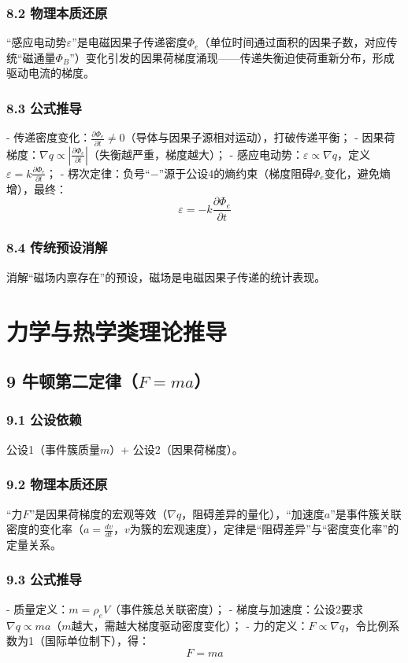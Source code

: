 \documentclass{article}
\newcommand{\rhoe}{\rho_e}       %
\begin{document}
\subsubsection{8.2 物理本质还原}
“感应电动势$\varepsilon$”是电磁因果子传递密度$\Phi_e$（单位时间通过面积的因果子数，对应传统“磁通量$\Phi_B$”）变化引发的因果荷梯度涌现——传递失衡迫使荷重新分布，形成驱动电流的梯度。

\subsubsection{8.3 公式推导}
- 传递密度变化：$\frac{\partial \Phi_e}{\partial t} \neq 0$（导体与因果子源相对运动），打破传递平衡；  
- 因果荷梯度：$\nabla q \propto \left| \frac{\partial \Phi_e}{\partial t} \right|$（失衡越严重，梯度越大）；  
- 感应电动势：$\varepsilon \propto \nabla q$，定义$\varepsilon = k \frac{\partial \Phi_e}{\partial t}$；  
- 楞次定律：负号“$-$”源于公设4的熵约束（梯度阻碍$\Phi_e$变化，避免熵增），最终：  
$$\varepsilon = -k \frac{\partial \Phi_e}{\partial t}$$

\subsubsection{8.4 传统预设消解}
消解“磁场内禀存在”的预设，磁场是电磁因果子传递的统计表现。

\newpage

\section{力学与热学类理论推导}
\subsection{9 牛顿第二定律（$F = m a$）}
\subsubsection{9.1 公设依赖}
公设1（事件簇质量$m$）+ 公设2（因果荷梯度）。

\subsubsection{9.2 物理本质还原}
“力$F$”是因果荷梯度的宏观等效（$\nabla q$，阻碍差异的量化），“加速度$a$”是事件簇关联密度的变化率（$a = \frac{dv}{dt}$，$v$为簇的宏观速度），定律是“阻碍差异”与“密度变化率”的定量关系。

\subsubsection{9.3 公式推导}
- 质量定义：$m = \rhoe V$（事件簇总关联密度）；  
- 梯度与加速度：公设2要求$\nabla q \propto m a$（$m$越大，需越大梯度驱动密度变化）；  
- 力的定义：$F \propto \nabla q$，令比例系数为1（国际单位制下），得：  
$$F = m a$$
\end{document}
